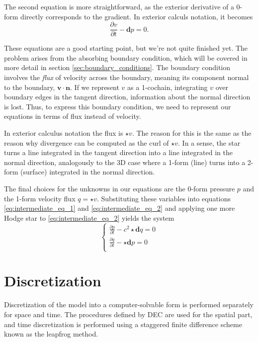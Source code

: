 \documentclass[utf8,english]{gradu3}
\begin{document}
The second equation is more straightforward,
as the exterior derivative of a 0-form directly corresponds to the gradient.
In exterior calculs notation, it becomes
\begin{equation}\label{eq:intermediate_eq_2}
  \frac{\partial v}{\partial t} - \mathbf{d} p = 0.
\end{equation}

These equations are a good starting point, but we're not quite finished yet.
The problem arises from the absorbing boundary condition,
which will be covered in more detail in section \ref{sec:boundary_conditions}.
The boundary condition involves the \textit{flux} of velocity across the boundary,
meaning its component normal to the boundary, $\mathbf{v} \cdot \mathbf{n}$.
If we represent $v$ as a 1-cochain, integrating $v$ over boundary edges
in the tangent direction, information about the normal direction is lost.
Thus, to express this boundary condition,
we need to represent our equations in terms of flux instead of velocity.

In exterior calculus notation the flux is $\star v$.
The reason for this is the same as the reason
why divergence can be computed as the curl of $\star v$.
In a sense, the star turns a line integrated in the tangent direction
into a line integrated in the normal direction,
analogously to the 3D case where a 1-form (line)
turns into a 2-form (surface) integrated in the normal direction.

The final choices for the unknowns in our equations
are the 0-form pressure $p$
and the 1-form velocity flux $q = \star v$.
Substituting these variables into equations \eqref{eq:intermediate_eq_1}
and \eqref{eq:intermediate_eq_2} and applying one more Hodge star 
to \eqref{eq:intermediate_eq_2} yields the system
\begin{equation}
  \begin{cases}
    \frac{\partial p}{\partial t} - c^2 \star \mathbf{d} q = 0 \\
    \frac{\partial q}{\partial t} - \star \mathbf{d} p = 0 \\
  \end{cases}
\end{equation}


\section{Discretization}

Discretization of the model into a computer-solvable form
is performed separately for space and time.
The procedures defined by DEC are used for the spatial part,
and time discretization is performed using a staggered
finite difference scheme known as the leapfrog method.
\end{document}
